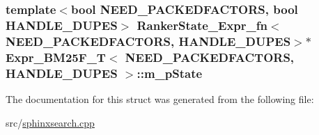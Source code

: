 \hypertarget{structExpr__BM25F__T_acbdbcebc2b54b055689f57dbb90000bd}{
\subsubsection[{m\-\_\-p\-State}]{\setlength{\rightskip}{0pt plus 5cm}template$<$bool N\-E\-E\-D\-\_\-\-P\-A\-C\-K\-E\-D\-F\-A\-C\-T\-O\-R\-S, bool H\-A\-N\-D\-L\-E\-\_\-\-D\-U\-P\-E\-S$>$ {\bf Ranker\-State\-\_\-\-Expr\-\_\-fn}$<$N\-E\-E\-D\-\_\-\-P\-A\-C\-K\-E\-D\-F\-A\-C\-T\-O\-R\-S, H\-A\-N\-D\-L\-E\-\_\-\-D\-U\-P\-E\-S$>$$\ast$ {\bf Expr\-\_\-\-B\-M25\-F\-\_\-\-T}$<$ N\-E\-E\-D\-\_\-\-P\-A\-C\-K\-E\-D\-F\-A\-C\-T\-O\-R\-S, H\-A\-N\-D\-L\-E\-\_\-\-D\-U\-P\-E\-S $>$\-::m\-\_\-p\-State}}\label{structExpr__BM25F__T_acbdbcebc2b54b055689f57dbb90000bd}


The documentation for this struct was generated from the following file\-:\begin{DoxyCompactItemize}
\item 
src/\hyperlink{sphinxsearch_8cpp}{sphinxsearch.\-cpp}\end{DoxyCompactItemize}
